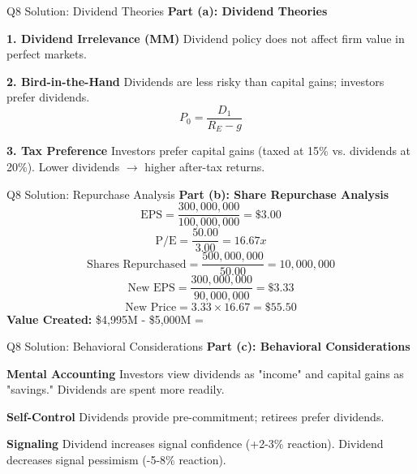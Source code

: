 \documentclass[aspectratio=169,10pt]{beamer}
\renewcommand{\small}{\fontsize{6pt}{7.5pt}\selectfont}
\renewcommand{\large}{\fontsize{8pt}{10pt}\selectfont}
\newcommand{\question}[1]{{\large\bfseries\color{crimson}#1}}
\begin{document}
	\begin{frame}{Q8 Solution: Dividend Theories}
		\question{Part (a): Dividend Theories}
		\small
		
		\textbf{1. Dividend Irrelevance (MM)}
		Dividend policy does not affect firm value in perfect markets.
		
		\vspace{0.1cm}
		\textbf{2. Bird-in-the-Hand}
		Dividends are less risky than capital gains; investors prefer dividends.
		\[
		P_0 = \frac{D_1}{R_E - g}
		\]
		
		\vspace{0.1cm}
		\textbf{3. Tax Preference}
		Investors prefer capital gains (taxed at 15\% vs. dividends at 20\%).
		Lower dividends $\rightarrow$ higher after-tax returns.
	\end{frame}
	
	\begin{frame}{Q8 Solution: Repurchase Analysis}
		\question{Part (b): Share Repurchase Analysis}
		\small
		\[
		\text{EPS} = \frac{300,000,000}{100,000,000} = \boxed{\$3.00}
		\]
		\[
		\text{P/E} = \frac{50.00}{3.00} = \boxed{16.67x}
		\]
		\[
		\text{Shares Repurchased} = \frac{500,000,000}{50.00} = \boxed{10,000,000}
		\]
		\[
		\text{New EPS} = \frac{300,000,000}{90,000,000} = \boxed{\$3.33}
		\]
		\[
		\text{New Price} = 3.33 \times 16.67 = \boxed{\$55.50}
		\]
		\textbf{Value Created:} \$4,995M - \$5,000M = 
	\end{frame}
	
	\begin{frame}{Q8 Solution: Behavioral Considerations}
		\question{Part (c): Behavioral Considerations}
		\small
		
		\textbf{Mental Accounting}
		Investors view dividends as "income" and capital gains as "savings." Dividends are spent more readily.
		
		\vspace{0.1cm}
		\textbf{Self-Control}
		Dividends provide pre-commitment; retirees prefer dividends.
		
		\vspace{0.1cm}
		\textbf{Signaling}
		Dividend increases signal confidence (+2-3\% reaction).
		Dividend decreases signal pessimism (-5-8\% reaction).
	\end{frame}
	
\end{document}
